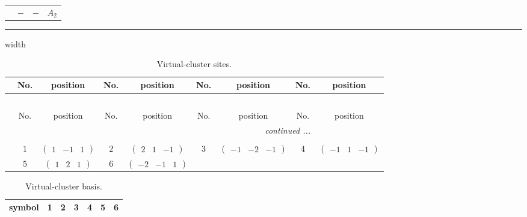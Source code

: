 \documentclass[fleqn,10pt,landscape]{article}
\begin{document}
\begin{itemize}
\begin{center}
\begin{longtable}{cccc}
$  $ & $ - $ & $ - $ & $ A_{2} $ \\
\end{longtable}
\end{center}

 \hfil \hrule height 1mm width \textwidth \hfil

{
\scriptsize
\begin{center}
\renewcommand{\arraystretch}{1.7}
\begin{longtable}{ccccccccc}
\caption{Virtual-cluster sites.}
 \\
 \hline \hline
 & No. & position & No. & position & No. & position & No. & position \\ \hline \endfirsthead

\multicolumn{8}{l}{\tablename\ \thetable{}} \\
 \hline \hline
 & No. & position & No. & position & No. & position & No. & position \\ \hline \endhead

 \hline \hline
\multicolumn{8}{r}{\footnotesize\it continued ...} \\ \endfoot

 \hline \hline
\multicolumn{8}{r}{} \\ \endlastfoot

 & $ 1 $ & $ \begin{pmatrix} 1 & -1 & 1 \end{pmatrix} $ & $ 2 $ & $ \begin{pmatrix} 2 & 1 & -1 \end{pmatrix} $ & $ 3 $ & $ \begin{pmatrix} -1 & -2 & -1 \end{pmatrix} $ & $ 4 $ & $ \begin{pmatrix} -1 & 1 & -1 \end{pmatrix} $ \\
& $ 5 $ & $ \begin{pmatrix} 1 & 2 & 1 \end{pmatrix} $ & $ 6 $ & $ \begin{pmatrix} -2 & -1 & 1 \end{pmatrix} $ & $  $ & $  $ & $  $ & $  $ \\
\end{longtable}
\end{center}
\begin{center}
\renewcommand{\arraystretch}{1.7}
\begin{longtable}{ccccccc}
\caption{Virtual-cluster basis.}
 \\
 \hline \hline
symbol & 1 & 2 & 3 & 4 & 5 & 6 \\ \hline \endfirsthead


\end{longtable}
\end{center}}
\end{itemize}
\end{document}
